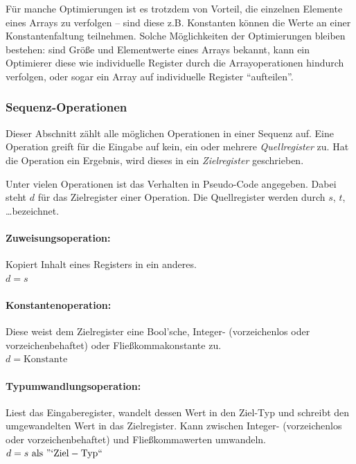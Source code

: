 \documentclass[twoside,a4paper,fleqn,12pt]{article}
\begin{document}
Für manche Optimierungen ist es trotzdem von Vorteil, die einzelnen Elemente eines Arrays zu verfolgen -- sind diese
z.B. Konstanten können die Werte an einer Konstantenfaltung teilnehmen. Solche Möglichkeiten der Optimierungen
bleiben bestehen: sind Größe und Elementwerte eines Arrays bekannt, kann ein Optimierer diese wie individuelle
Register durch die Arrayoperationen hindurch verfolgen, oder sogar ein Array auf individuelle Register "`aufteilen"'.

\subsubsection{Sequenz-Operationen}

Dieser Abschnitt zählt alle möglichen Operationen in einer Sequenz auf. Eine Operation greift für die Eingabe auf kein, ein oder mehrere
\emph{Quellregister} zu. Hat die Operation ein Ergebnis, wird dieses in ein \emph{Zielregister} geschrieben. 

Unter vielen Operationen ist das Verhalten in Pseudo-Code angegeben. Dabei steht $d$ für das Zielregister einer Operation.
Die Quellregister werden durch $s$, $t$, \dots bezeichnet. 

\paragraph{Zuweisungsoperation:} Kopiert Inhalt eines Registers in ein anderes.
\\\hspace*{1cm}$d = s$

\paragraph{Konstantenoperation:} Diese weist dem Zielregister eine Bool'sche, Integer- (vorzeichenlos oder vorzeichenbehaftet) oder
Fließkommakonstante zu.
\\\hspace*{1cm}$d = \mathrm{Konstante}$

\paragraph{Typumwandlungsoperation:} Liest das Eingaberegister, wandelt dessen Wert in den Ziel-Typ und schreibt den umgewandelten Wert in das Zielregister.
Kann zwischen Integer- (vorzeichenlos oder vorzeichenbehaftet) und Fließkommawerten umwandeln.
\\\hspace*{1cm}$d = s\ \mathrm{als}\ \mathrm{"`Ziel-Typ``}$
\end{document}
